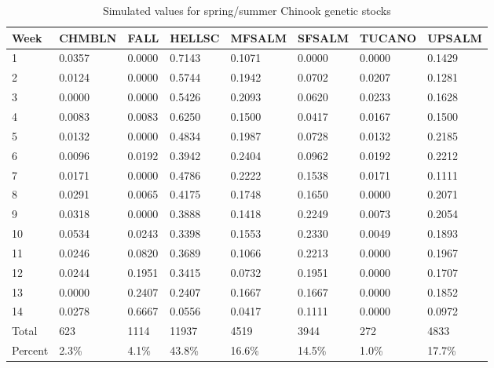 \documentclass[12pt]{article}
\begin{document}
\begin{table} [h]
\caption{Simulated values for spring/summer Chinook genetic stocks}
\label{table:CHsimO} 
\begin{center}
\begin{tabular}{|l|l|l|l|l|l|l|l|}
\hline Week&CHMBLN&FALL&HELLSC&MFSALM&SFSALM&TUCANO&UPSALM \\ \hline
1&0.0357&0.0000&0.7143&0.1071&0.0000&0.0000&0.1429 \\ \hline
2&0.0124&0.0000&0.5744&0.1942&0.0702&0.0207&0.1281 \\ \hline
3&0.0000&0.0000&0.5426&0.2093&0.0620&0.0233&0.1628 \\ \hline
4&0.0083&0.0083&0.6250&0.1500&0.0417&0.0167&0.1500 \\ \hline
5&0.0132&0.0000&0.4834&0.1987&0.0728&0.0132&0.2185 \\ \hline
6&0.0096&0.0192&0.3942&0.2404&0.0962&0.0192&0.2212 \\ \hline
7&0.0171&0.0000&0.4786&0.2222&0.1538&0.0171&0.1111 \\ \hline
8&0.0291&0.0065&0.4175&0.1748&0.1650&0.0000&0.2071 \\ \hline
9&0.0318&0.0000&0.3888&0.1418&0.2249&0.0073&0.2054 \\ \hline
10&0.0534&0.0243&0.3398&0.1553&0.2330&0.0049&0.1893 \\ \hline
11&0.0246&0.0820&0.3689&0.1066&0.2213&0.0000&0.1967 \\ \hline
12&0.0244&0.1951&0.3415&0.0732&0.1951&0.0000&0.1707 \\ \hline
13&0.0000&0.2407&0.2407&0.1667&0.1667&0.0000&0.1852 \\ \hline
14&0.0278&0.6667&0.0556&0.0417&0.1111&0.0000&0.0972 \\ \hline
Total&623&1114&11937&4519&3944&272&4833 \\ \hline
Percent&2.3\%&4.1\%&43.8\%&16.6\%&14.5\%&1.0\%&17.7\% \\ \hline
\end{tabular}
\end{center}
\end{table}
\end{document}
